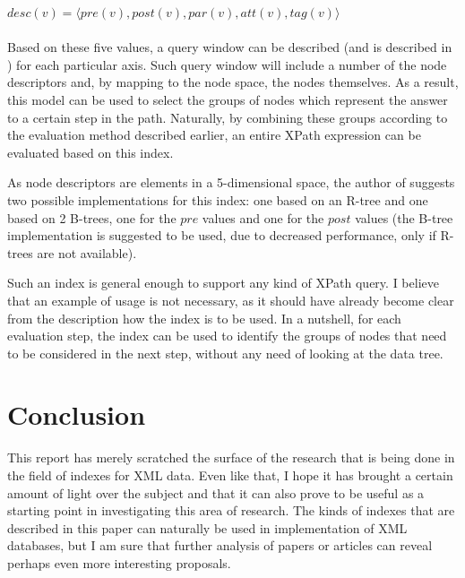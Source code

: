 \documentclass[a4paper,10pt]{article}
\begin{document}
\begin{math}
desc(v) = \langle{}pre(v), post(v), par(v), att(v), tag(v)\rangle
\end{math}\\
\\
\indent{}Based on these five values, a query window can be described (and is described in \cite{gru02})
for each particular axis. Such query window will include a number of the node descriptors and, by
mapping to the node space, the nodes themselves. As a result, this model can be used to select
the groups of nodes which represent the answer to a certain step in the path. Naturally, by combining
these groups according to the evaluation method described earlier, an entire XPath expression can
be evaluated based on this index.

As node descriptors are elements in a 5-dimensional space, the author of \cite{gru02} suggests two
possible implementations for this index: one based on an R-tree and one based on 2 B-trees, one for
the $pre$ values and one for the $post$ values (the B-tree implementation is suggested to be used,
due to decreased performance, only if R-trees are not available).

Such an index is general enough to support any kind of XPath query. I believe that an example of
usage is not necessary, as it should have already become clear from the description how the index is
to be used. In a nutshell, for each evaluation step, the index can be used to identify the groups of
nodes that need to be considered in the next step, without any need of looking at the data tree.

\section{Conclusion}

This report has merely scratched the surface of the research that is being done in the field of
indexes for XML data. Even like that, I hope it has brought a certain amount of light over the
subject and that it can also prove to be useful as a starting point in investigating this area of
research. The kinds of indexes that are described in this paper can naturally be used in implementation
of XML databases, but I am sure that further analysis of papers or articles can reveal perhaps
even more interesting proposals.
\end{document}

